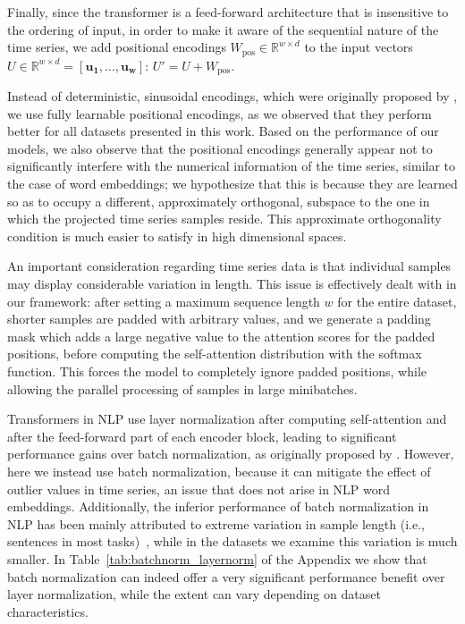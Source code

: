 \documentclass{article} \usepackage{iclr2021_conference,times}
\begin{document}
Finally, since the transformer is a feed-forward architecture that is insensitive to the ordering of input, in order to make it aware of the sequential nature of the time series, we add positional encodings $W_{\textrm{pos}} \in \mathbb{R}^{w\times d}$ to the input vectors $U \in \mathbb{R}^{w\times d}  = [\mathbf{u_1}, \dots, \mathbf{u_w}]$: $U' = U + W_{\textrm{pos}}$.

Instead of deterministic, sinusoidal encodings, which were originally proposed by \cite{vaswani_attention_2017}, we use fully learnable positional encodings, as we observed that they perform better for all datasets presented in this work. Based on the performance of our models, we also observe that the positional encodings generally appear not to significantly interfere with the numerical information of the time series, similar to the case of word embeddings; we hypothesize that this is because they are learned so as to occupy a different, approximately orthogonal, subspace to the one in which the projected time series samples reside. This approximate orthogonality condition is much easier to satisfy in high dimensional spaces. 

An important consideration regarding time series data is that individual samples may display considerable variation in length. This issue is effectively dealt with in our framework: after setting a maximum sequence length $w$ for the entire dataset, shorter samples are padded with arbitrary values, and we generate a padding mask which adds a large negative value to the attention scores for the padded positions, before computing the self-attention distribution with the softmax function. This forces the model to completely ignore padded positions, while allowing the parallel processing of samples in large minibatches.

Transformers in NLP use layer normalization after computing self-attention and after the feed-forward part of each encoder block, leading to significant performance gains over batch normalization, as originally proposed by \cite{vaswani_attention_2017}. However, here we instead use batch normalization, because it can mitigate the effect of outlier values in time series, an issue that does not arise in NLP word embeddings. Additionally, the inferior performance of batch normalization in NLP has been mainly attributed to extreme variation in sample length (i.e., sentences in most tasks)~\citep{powernorm_2020}, while in the datasets we examine this variation is much smaller. In Table~\ref{tab:batchnorm_layernorm} of the Appendix we show that batch normalization can indeed offer a very significant performance benefit over layer normalization, while the extent can vary depending on dataset characteristics. 
\end{document}
